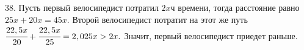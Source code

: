 38. Пусть первый велосипедист потратил $2x$ч времени, тогда расстояние равно $25x+20x=45x.$ Второй велосипедист потратит на этот же путь $\cfrac{22,5x}{20}+
\cfrac{22,5x}{25}=2,025x>2x.$ Значит, первый велосипедист приедет раньше.\\
